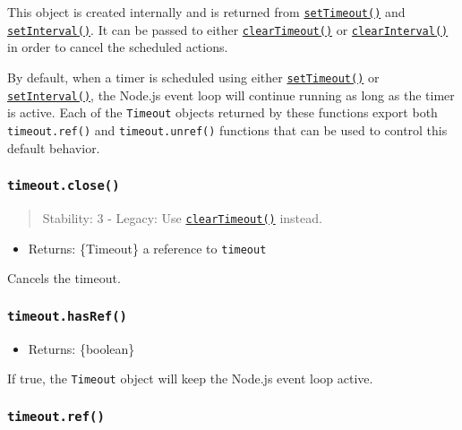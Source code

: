 This object is created internally and is returned from
\hyperref[settimeoutcallback-delay-args]{\texttt{setTimeout()}} and
\hyperref[setintervalcallback-delay-args]{\texttt{setInterval()}}. It
can be passed to either
\hyperref[cleartimeouttimeout]{\texttt{clearTimeout()}} or
\hyperref[clearintervaltimeout]{\texttt{clearInterval()}} in order to
cancel the scheduled actions.

By default, when a timer is scheduled using either
\hyperref[settimeoutcallback-delay-args]{\texttt{setTimeout()}} or
\hyperref[setintervalcallback-delay-args]{\texttt{setInterval()}}, the
Node.js event loop will continue running as long as the timer is active.
Each of the \texttt{Timeout} objects returned by these functions export
both \texttt{timeout.ref()} and \texttt{timeout.unref()} functions that
can be used to control this default behavior.

\subsubsection{\texorpdfstring{\texttt{timeout.close()}}{timeout.close()}}\label{timeout.close}

\begin{quote}
Stability: 3 - Legacy: Use
\hyperref[cleartimeouttimeout]{\texttt{clearTimeout()}} instead.
\end{quote}

\begin{itemize}
\tightlist
\item
  Returns: \{Timeout\} a reference to \texttt{timeout}
\end{itemize}

Cancels the timeout.

\subsubsection{\texorpdfstring{\texttt{timeout.hasRef()}}{timeout.hasRef()}}\label{timeout.hasref}

\begin{itemize}
\tightlist
\item
  Returns: \{boolean\}
\end{itemize}

If true, the \texttt{Timeout} object will keep the Node.js event loop
active.

\subsubsection{\texorpdfstring{\texttt{timeout.ref()}}{timeout.ref()}}\label{timeout.ref}

